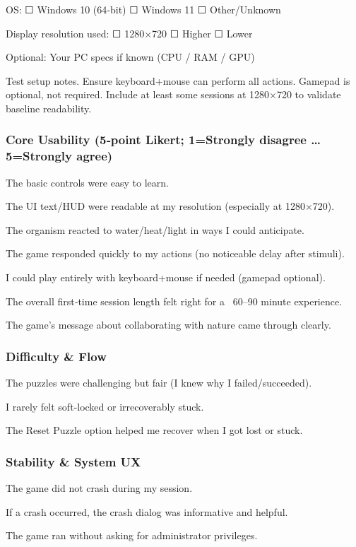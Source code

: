 \documentclass[12pt, titlepage]{article}
\begin{document}
OS: ☐ Windows 10 (64‑bit) ☐ Windows 11 ☐ Other/Unknown

Display resolution used: ☐ 1280×720 ☐ Higher ☐ Lower

Optional: Your PC specs if known (CPU / RAM / GPU)

Test setup notes. Ensure keyboard+mouse can perform all actions. Gamepad is optional, not required. Include at least some sessions at 1280×720 to validate baseline readability.

\subsubsection{Core Usability (5‑point Likert; 1=Strongly disagree … 5=Strongly agree)}

The basic controls were easy to learn.

The UI text/HUD were readable at my resolution (especially at 1280×720).

The organism reacted to water/heat/light in ways I could anticipate.

The game responded quickly to my actions (no noticeable delay after stimuli).

I could play entirely with keyboard+mouse if needed (gamepad optional).

The overall first‑time session length felt right for a ~60–90 minute experience.

The game’s message about collaborating with nature came through clearly.

\subsubsection{Difficulty & Flow}

The puzzles were challenging but fair (I knew why I failed/succeeded).

I rarely felt soft‑locked or irrecoverably stuck.

The Reset Puzzle option helped me recover when I got lost or stuck.

\subsubsection{Stability & System UX}

The game did not crash during my session.

If a crash occurred, the crash dialog was informative and helpful.

The game ran without asking for administrator privileges.
\end{document}
